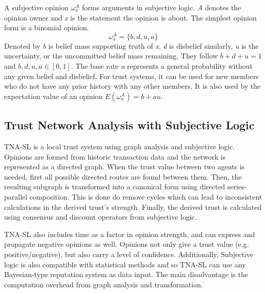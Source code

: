 \documentclass[%
    ]{\PathToTumTemplate/thesis/tum_thesis}
\begin{document}
A subjective opinion $ \omega_x^A $ forms arguments in subjective logic.
\emph{A} denotes the opinion owner and \emph{x} is the statement the opinion is about.
The simplest opinion form is a binomial opinion.
\begin{equation}
\omega_x^A = \{b, d, u, a\}
\end{equation}
Denoted by \emph{b} is belief mass supporting truth of \emph{x}, \emph{d} is disbelief similarly, \emph{u} is the uncertainty, or the uncommitted belief mass remaining.
They follow $b + d + u = 1$ and $b, d, u, a \in [0,1]$.
The base rate \emph{a} represents a general probability without any given belief and disbelief.
For trust systems, it can be used for new members who do not have any prior history with any other members.
It is also used by the expectation value of an opinion $E(\omega_x^A)=b+au$.








\subsection{Trust Network Analysis with Subjective Logic}
TNA-SL is a local trust system using graph analysis and subjective logic. \cite{josang_trust_2006} Opinions are formed from historic transaction data and the network is represented as a directed graph. When the trust value between two agents is needed, first all possible directed routes are found between them. Then, the resulting subgraph is transformed into a canonical form using directed series-parallel composition. This is done do remove cycles which can lead to inconsistent calculations in the derived trust's strength. Finally, the derived trust is calculated using consensus and discount operators from subjective logic.

TNA-SL also includes time as a factor in opinion strength, and can express and propagate negative opinions as well. Opinions not only give a trust value (e.g. positive/negative), but also carry a level of confidence. Additionally, Subjective logic is also compatible with statistical methods and so TNA-SL can use any Bayesian-type reputation system as data input. The main disadvantage is the computation overhead from graph analysis and transformation.








\end{document}
